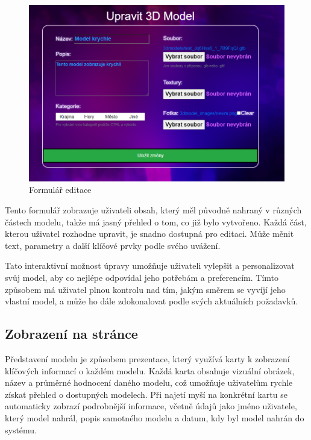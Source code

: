 \documentclass[12pt, a4paper,
oneside,      %
openright
]{report}
\begin{document}
\begin{figure}[h]
			\centering
			\includegraphics[width=1\linewidth]{image/edit.png} 
			\caption{Formulář editace}
		\end{figure}
		
Tento formulář zobrazuje uživateli obsah, který měl původně nahraný v různých částech modelu, takže má jasný přehled o tom, co již bylo vytvořeno. Každá část, kterou uživatel rozhodne upravit, je snadno dostupná pro editaci. Může měnit text, parametry a další klíčové prvky podle svého uvážení.


Tato interaktivní možnost úpravy umožňuje uživateli vylepšit a personalizovat svůj model, aby co nejlépe odpovídal jeho potřebám a preferencím. Tímto způsobem má uživatel plnou kontrolu nad tím, jakým směrem se vyvíjí jeho vlastní model, a může ho dále zdokonalovat podle svých aktuálních požadavků.
\subsection[Zobrazení na stránce]{Zobrazení na stránce}
Představení modelu je způsobem prezentace, který využívá karty k zobrazení klíčových informací o každém modelu. Každá karta obsahuje vizuální obrázek, název a průměrné hodnocení daného modelu, což umožňuje uživatelům rychle získat přehled o dostupných modelech. Při najetí myší na konkrétní kartu se automaticky zobrazí podrobnější informace, včetně údajů jako jméno uživatele, který model nahrál, popis samotného modelu a datum, kdy byl model nahrán do systému.
\end{document}
